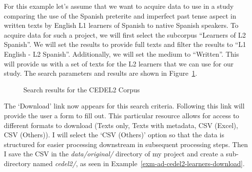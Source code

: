 \documentclass[
  letterpaper,
]{latex/krantz}
\theoremstyle{definition}
\theoremstyle{remark}
\begin{document}
For this example let's assume that we want to acquire data to use in a
study comparing the use of the Spanish preterite and imperfect past
tense aspect in written texts by English L1 learners of Spanish to
native Spanish speakers. To acquire data for such a project, we will
first select the subcorpus ``Learners of L2 Spanish''. We will set the
results to provide full texts and filter the results to ``L1 English -
L2 Spanish''. Additionally, we will set the medium to ``Written''. This
will provide us with a set of texts for the L2 learners that we can use
for our study. The search parameters and results are shown in
Figure~\ref{fig-ad-cedel2-results}.

\begin{figure}[H]


\caption{\label{fig-ad-cedel2-results}Search results for the CEDEL2
Corpus}

\end{figure}%

The `Download' link now appears for this search criteria. Following this
link will provide the user a form to fill out. This particular resource
allows for access to different formats to download (Texts only, Texts
with metadata, CSV (Excel), CSV (Others)). I will select the `CSV
(Others)' option so that the data is structured for easier processing
downstream in subsequent processing steps. Then I save the CSV in the
\emph{data/original/} directory of my project and create a sub-directory
named \emph{cedel2/}, as seen in
Example~\ref{exm-ad-cedel2-learners-download}.
\end{document}
